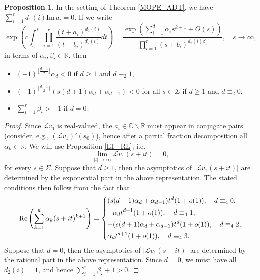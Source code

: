 \documentclass[a4paper,12pt,oneside]{article}
\theoremstyle{definition}
\newtheorem{prop}[defi]{Proposition}
\newcommand{\C}{\mathbb{C}}
\newcommand{\R}{\mathbb{R}}
\newcommand{\LT}[1]{\mathcal{L}#1}
\begin{document}
\begin{prop} \label{ADT_COND}
In the setting of Theorem \ref{MOPE_ADT}, we have $\sum_{i=1}^r d_1(i) \text{Im}\,a_i = 0$. If we write
$$ \exp\left(c \int_{s_0}^s \prod_{i=1}^r \frac{(t+a_i)^{d_1(i)}}{(t+b_i)^{d_2(i)}} dt \right) =  \frac{\exp\left(\sum_{i=1}^{d} \alpha_i s^{k+1} + O(s)\right)}{\prod_{i=1}^r (s+b_i)^{d_2(i)\beta_i}},\quad s\to\infty,$$
in terms of $\alpha_i,\beta_i\in\R$, then
\begin{itemize} 
    \item[$i)$] $(-1)^{\lfloor \frac{d+1}{2} \rfloor} \alpha_d<0$ if $d \geq 1$ and $d\equiv_2 1$,
    \item[$ii)$] $ (-1)^{\lfloor \frac{d+1}{2} \rfloor} (s(d+1)\alpha_{d}+\alpha_{d-1})<0$ for all $s\in\Sigma$ if $d \geq 1$ and $d\equiv_2 0$,
    \item[$iii)$] $\sum_{i=1}^r \beta_i > - 1$ if $d=0$.
\end{itemize}
\end{prop}
\begin{proof}
    Since $\LT{v_1}$ is real-valued, the $a_i\in\C\backslash\R$ must appear in conjugate pairs (consider, e.g., $(\LT{v_1})'(s_0)$), hence after a partial fraction decomposition all $\alpha_k\in\R$. We will use Proposition \ref{LT_RL}, i.e.
    $$ \lim_{|t|\to\infty} \LT{v_1}(s+it)=0, $$
    for every $s\in\Sigma$. Suppose that $d\geq 1$, then the asymptotics of $|\LT{v_1}(s+it)|$ are determined by the exponential part in the above representation. The stated conditions then follow from the fact that
        $$ \text{Re}\left(\sum_{k=1}^{d} \alpha_{k} (s+it)^{k+1} \right) = \begin{dcases}
            (s(d+1)\alpha_{d}+\alpha_{d-1}) t^{d} (1+o(1)) ,\quad d \equiv_4 0,\\
            - \alpha_{d} t^{d+1} (1+o(1)) ,\quad d \equiv_4 1, \\
            -(s(d+1)\alpha_{d}+\alpha_{d-1}) t^{d} (1+o(1)) ,\quad d \equiv_4 2,\\
            \alpha_{d} t^{d+1} (1+o(1)) ,\quad d \equiv_4 3.\\
        \end{dcases} $$
    Suppose that $d=0$, then the asymptotics of $|\LT{v_1}(s+it)|$ are determined by the rational part in the above representation. Since $d=0$, we must have all $d_2(i)=1$, and hence $\sum_{i=1}^{r} \beta_i + 1  > 0$.
\end{proof}
\end{document}
